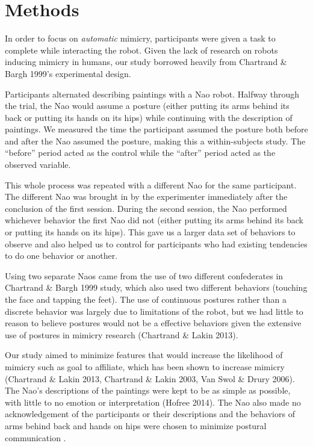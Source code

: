 \documentclass{acm_proc_article-sp}
\begin{document}
\section{Methods} 
In order to focus on \textit{automatic} mimicry, participants were given a task to complete while interacting the robot. Given the lack of research on robots inducing mimicry in humans, our study borrowed heavily from Chartrand \& Bargh 1999's experimental design. 

Participants alternated describing paintings with a Nao robot. Halfway through the trial, the Nao would assume a posture (either putting its arms behind its back or putting its hands on its hips) while continuing with the description of paintings. We measured the time the participant assumed the posture both before and after the Nao assumed the posture, making this a within-subjects study. The ``before'' period acted as the control while the ``after'' period acted as the observed variable.

This whole process was repeated with a different Nao for the same participant. The different Nao was brought in by the experimenter immediately after the conclusion of the first session. During the second session, the Nao performed whichever behavior the first Nao did not (either putting its arms behind its back or putting its hands on its hips). This gave us a larger data set of behaviors to observe and also helped us to control for participants who had existing tendencies to do one behavior or another.

Using two separate Naos came from the use of two different confederates in Chartrand \& Bargh 1999 study, which also used two different behaviors (touching the face and tapping the feet). The use of continuous postures rather than a discrete behavior was largely due to limitations of the robot, but we had little to reason to believe postures would not be a effective behaviors given the extensive use of postures in mimicry research (Chartrand \& Lakin 2013). 

Our study aimed to minimize features that would increase the likelihood of mimicry such as goal to affiliate, which has been shown to increase mimicry (Chartrand \& Lakin 2013, Chartrand \& Lakin 2003, Van Swol & Drury 2006). The Nao's descriptions of the paintings were kept to be as simple as possible, with little to no emotion or interpretation (Hofree 2014). The Nao also made no acknowledgement of the participants or their descriptions and the behaviors of arms behind back and hands on hips were chosen to minimize postural communication . 
\end{document}
